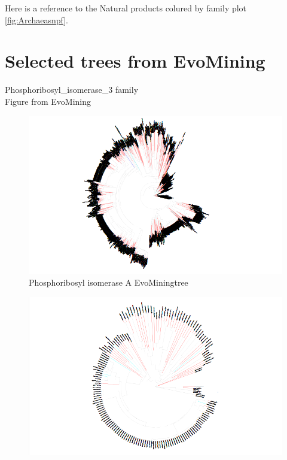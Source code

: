 \documentclass[12pt,twoside]{reedthesis}
\begin{document}
  Here is a reference to the Natural products colured by family plot
  \autoref{fig:Archaeasnpf}. \clearpage 
  
  \section{Selected trees from
  EvoMining}\label{selected-trees-from-evomining}
  
  Phosphoribosyl\_isomerase\_3 family\\
  Figure from EvoMining
  
  \begin{figure}[h!tbp]
  \centering
  \includegraphics[angle = 180,scale = 0.25]{chapter3/tree41.png}
  \caption[Phosphoribosyl isomerase A EvoMiningtree]{\normalsize{Phosphoribosyl isomerase A EvoMiningtree}}
  \label{fig:Phosphoribosyl_isomerase_A_evo_tree}
  \end{figure}\begin{figure}[h!tbp]
  \centering
  \includegraphics[angle = 180,scale = 0.25]{chapter3/tree42.png}

\end{figure}
\end{document}
